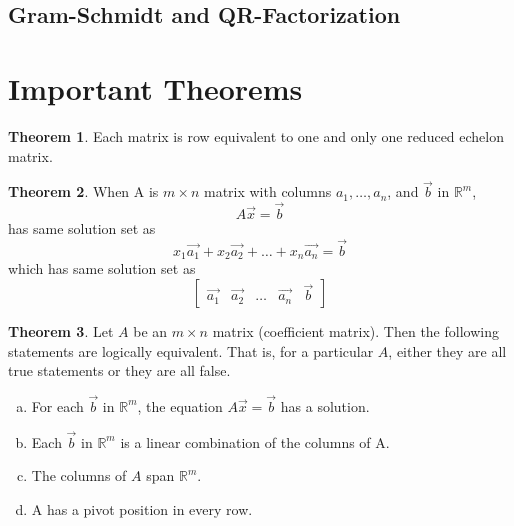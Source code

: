 \documentclass[a4paper,12pt]{article}
\theoremstyle{definition}
\newtheorem{theorem}{Theorem}
\theoremstyle{definition}
\newcommand{\mateq}[3]{#1#2 = #3}
\newcommand{\mateqaxb}{\mateq{A}{\vec{x}}{\vec{b}}}
\begin{document}
	\subsection{Gram-Schmidt and QR-Factorization}
	\newpage
	
	\section{Important Theorems}
	\begin{theorem}
		Each matrix is row equivalent to one and only one reduced echelon matrix.
	\end{theorem}
	
	\begin{theorem}
		\label{thm:A-x-b-thm}
		When A is $m \times n$ matrix with columns $a_1,\ldots,a_n$, and $\vec{b}$ in $\mathbb{R}^m$,
		\begin{equation*}
			\mateqaxb
		\end{equation*}
		has same solution set as
		\begin{equation*}
			x_1\vec{a_1} + x_2\vec{a_2} + \ldots + x_n\vec{a_n} = \vec{b}
		\end{equation*}
		which has same solution set as 
		\begin{equation*}
			\begin{bmatrix}
				\vec{a_1} & \vec{a_2} & \ldots & \vec{a_n} & \vec{b}
			\end{bmatrix}
		\end{equation*}
	\end{theorem}
	
	\begin{theorem}
		\label{thm:A-x-b-relation-thm}
		Let $A$ be an $m \times n$ matrix (coefficient matrix). Then the following statements are logically equivalent.
		That is, for a particular $A$, either they are all true statements or they are all false.
		\begin{enumerate}[a.]
			\item For each $\vec{b}$ in $\mathbb{R} ^ m$, the equation $A\vec{x} = \vec{b}$ has a solution.
			
			\item Each $\vec{b}$ in $\mathbb{R} ^ m$ is a linear combination of the columns of A.
			
			\item The columns of $A$ span $\mathbb{R} ^ m$.
			
			\item A has a pivot position in every row.
		\end{enumerate}
	\end{theorem}
	
\end{document}
